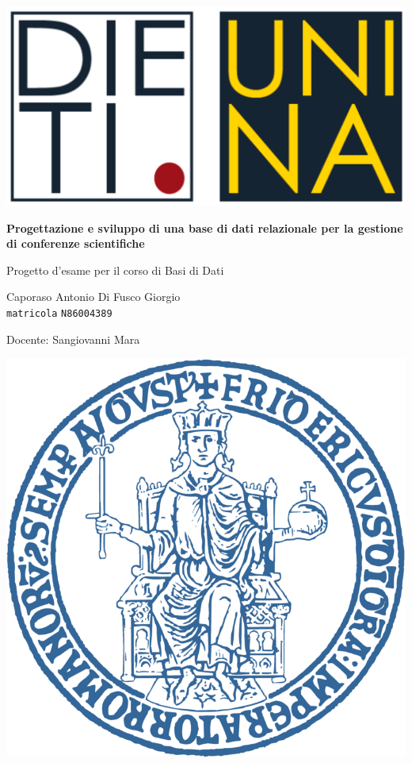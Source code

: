 \documentclass[a4paper, oneside, 11pt]{book}
\begin{document}
\begin{titlepage}
\begin{center}

\includegraphics[scale=0.6]{Immagini/logo_dieti.png}
\vspace*{1cm}

{\Huge{\textbf{Progettazione e sviluppo di una base di dati relazionale per la gestione di conferenze scientifiche}}}

\vspace{1cm}

{\Large Progetto d'esame per il corso di Basi di Dati}


\vfill

{\Large Caporaso Antonio} \qquad \Large{Di Fusco Giorgio}\\
\texttt{matricola} \qquad \texttt{N86004389}\\

\vspace{1cm}

Docente: Sangiovanni Mara\\

\vspace{1cm}

\includegraphics[scale=0.6]{Immagini/LogoUnina.png}



\end{center}
\end{titlepage}
\end{document}
